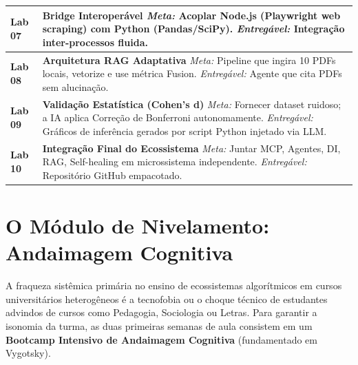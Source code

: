 \documentclass[12pt,a4paper]{article}
\begin{document}
\begin{longtable}{p{} p{}}
\midrule
\textbf{Lab 07} & \textbf{Bridge Interoperável} \newline \textit{Meta:} Acoplar Node.js (Playwright web scraping) com Python (Pandas/SciPy). \newline \textit{Entregável:} Integração inter-processos fluida. \\
\midrule
\textbf{Lab 08} & \textbf{Arquitetura RAG Adaptativa} \newline \textit{Meta:} Pipeline que ingira 10 PDFs locais, vetorize e use métrica Fusion. \newline \textit{Entregável:} Agente que cita PDFs sem alucinação. \\
\midrule
\textbf{Lab 09} & \textbf{Validação Estatística (Cohen's d)} \newline \textit{Meta:} Fornecer dataset ruidoso; a IA aplica Correção de Bonferroni autonomamente. \newline \textit{Entregável:} Gráficos de inferência gerados por script Python injetado via LLM. \\
\midrule
\textbf{Lab 10} & \textbf{Integração Final do Ecossistema} \newline \textit{Meta:} Juntar MCP, Agentes, DI, RAG, Self-healing em microssistema independente. \newline \textit{Entregável:} Repositório GitHub empacotado. \\
\bottomrule
\end{longtable}

\newpage
\section{O Módulo de Nivelamento: Andaimagem Cognitiva}

A fraqueza sistêmica primária no ensino de ecossistemas algorítmicos em cursos universitários heterogêneos é a tecnofobia ou o choque técnico de estudantes advindos de cursos como Pedagogia, Sociologia ou Letras. Para garantir a isonomia da turma, as duas primeiras semanas de aula consistem em um \textbf{Bootcamp Intensivo de Andaimagem Cognitiva} (fundamentado em Vygotsky).
\end{document}

